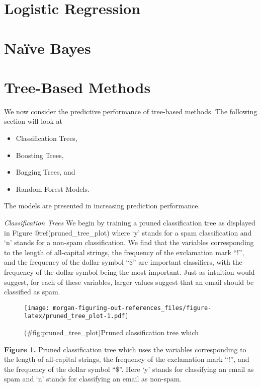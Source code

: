 \documentclass[
]{article}
\begin{document}
\hypertarget{logistic-regression}{%
\section{Logistic Regression}\label{logistic-regression}}

\hypertarget{nauxefve-bayes}{%
\section{Naïve Bayes}\label{nauxefve-bayes}}

\hypertarget{tree-based-methods}{%
\section{Tree-Based Methods}\label{tree-based-methods}}

We now consider the predictive performance of tree-based methods. The following section will look at

\begin{itemize}
\item
  Classification Trees,
\item
  Boosting Trees,
\item
  Bagging Trees, and
\item
  Random Forest Models.
\end{itemize}

The models are presented in increasing prediction performance.

\emph{Classification Trees} We begin by training a pruned classification tree as displayed in Figure @ref(pruned\_tree\_plot) where `y' stands for a spam classification and `n' stands for a non-spam classification. We find that the variables corresponding to the length of all-capital strings, the frequency of the exclamation mark ``!'', and the frequency of the dollar symbol ``\$'' are important classifiers, with the frequency of the dollar symbol being the most important. Just as intuition would suggest, for each of these variables, larger values suggest that an email should be classified as spam.

\begin{figure}
\centering
\texttt{[image: morgan-figuring-out-references\_files/figure-latex/pruned\_tree\_plot-1.pdf]}
\caption{(\#fig:pruned\_tree\_plot)Pruned classification tree which}
\end{figure}

\textbf{Figure 1.}\label{fig:classtree} Pruned classification tree which uses the variables corresponding to the length of all-capital strings, the frequency of the exclamation mark ``!'', and the frequency of the dollar symbol ``\$''. Here `y' stands for classifying an email as spam and `n' stands for classifying an email as non-spam.
\end{document}
